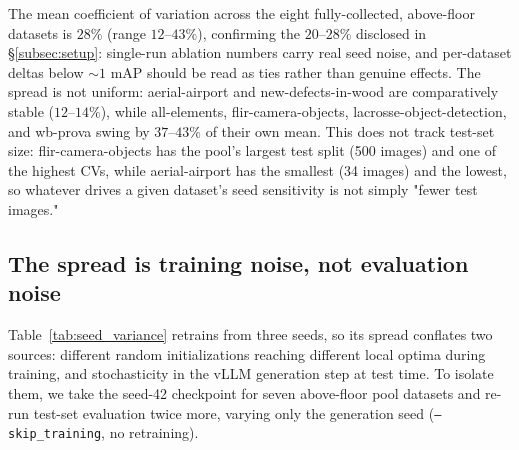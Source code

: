 \documentclass{article}
\begin{document}
The mean coefficient of variation across the eight fully-collected, above-floor datasets is $28\%$ (range $12$--$43\%$), confirming the $20$--$28\%$ disclosed in \S\ref{subsec:setup}: single-run ablation numbers carry real seed noise, and per-dataset deltas below ${\sim}1$ mAP should be read as ties rather than genuine effects.
The spread is not uniform: aerial-airport and new-defects-in-wood are comparatively stable ($12$--$14\%$), while all-elements, flir-camera-objects, lacrosse-object-detection, and wb-prova swing by $37$--$43\%$ of their own mean.
This does not track test-set size: flir-camera-objects has the pool's largest test split (500 images) and one of the highest CVs, while aerial-airport has the smallest (34 images) and the lowest, so whatever drives a given dataset's seed sensitivity is not simply "fewer test images."

\subsection{The spread is training noise, not evaluation noise}
\label{app:eval_seed_variance}

Table~\ref{tab:seed_variance} retrains from three seeds, so its spread
conflates two sources: different random initializations reaching different
local optima during training, and stochasticity in the vLLM generation step at
test time. To isolate them, we take the seed-42 checkpoint for seven
above-floor pool datasets and re-run test-set evaluation twice more, varying
only the generation seed (\texttt{--skip\_training}, no retraining).
\end{document}
